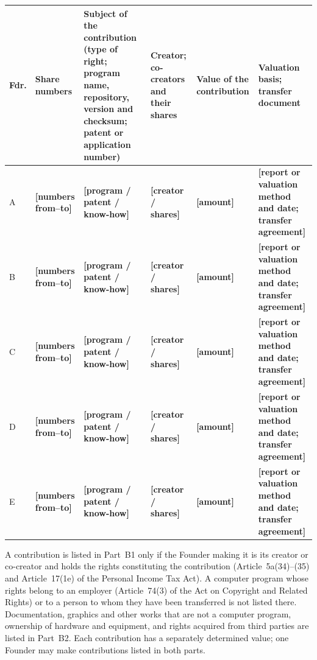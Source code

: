 \documentclass[12pt,a4paper]{report}
\newcommand{\field}[1]{\textbf{[#1]}}
\begin{document}
\begin{center}
\begin{tabularx}{\linewidth}{@{}p{0.9cm} p{2.0cm} >{\raggedright\arraybackslash}X >{\raggedright\arraybackslash}p{2.3cm} >{\raggedright\arraybackslash}p{1.85cm} >{\raggedright\arraybackslash}p{2.5cm}@{}}
\toprule
\textbf{Fdr.} & \textbf{Share numbers} & \textbf{Subject of the contribution (type of right; program name, repository, version and checksum; patent or application number)} & \textbf{Creator; co-creators and their shares} & \textbf{Value of the contri\-bution} & \textbf{Valuation basis; transfer document} \\
\midrule
A & \field{numbers from--to} & \field{program / patent / know-how} & \field{creator / shares} & \field{amount} & \field{report or valuation method and date; transfer agreement} \\
B & \field{numbers from--to} & \field{program / patent / know-how} & \field{creator / shares} & \field{amount} & \field{report or valuation method and date; transfer agreement} \\
C & \field{numbers from--to} & \field{program / patent / know-how} & \field{creator / shares} & \field{amount} & \field{report or valuation method and date; transfer agreement} \\
D & \field{numbers from--to} & \field{program / patent / know-how} & \field{creator / shares} & \field{amount} & \field{report or valuation method and date; transfer agreement} \\
E & \field{numbers from--to} & \field{program / patent / know-how} & \field{creator / shares} & \field{amount} & \field{report or valuation method and date; transfer agreement} \\
\bottomrule
\end{tabularx}
\end{center}

A contribution is listed in Part~B1 only if the Founder making it is its creator or co-creator and holds the rights constituting the contribution (Article~5a(34)--(35) and Article~17(1e) of the Personal Income Tax Act). A computer program whose rights belong to an employer (Article~74(3) of the Act on Copyright and Related Rights) or to a person to whom they have been transferred is not listed there. Documentation, graphics and other works that are not a computer program, ownership of hardware and equipment, and rights acquired from third parties are listed in Part~B2. Each contribution has a separately determined value; one Founder may make contributions listed in both parts.
\end{document}
